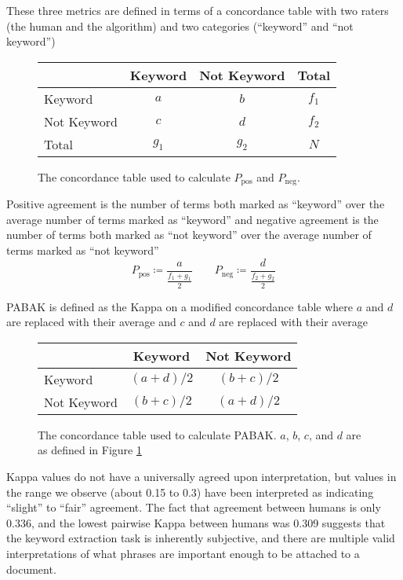 These three metrics are defined in terms of a concordance table with two raters (the human and the algorithm) and two categories (``keyword'' and ``not keyword'')

\begin{figure}[h]
\caption{The concordance table used to calculate $P_{\text{pos}}$ and $P_{\text{neg}}$. }
\label{fig:concordance_1}
\begin{tabular}{l || c c c}
& Keyword & Not Keyword & Total \\
\hline \hline
Keyword & $a$ & $b$ & $f_1$ \\
Not Keyword & $c$ & $d$ & $f_2$ \\
Total & $g_1$ & $g_2$ & $N$ \\
\end{tabular}
\end{figure}

Positive agreement is the number of terms both marked as ``keyword'' over the average number of terms marked as ``keyword'' and negative agreement is the number of terms both marked as ``not keyword'' over the average number of terms marked as ``not keyword''
\begin{equation*}
P_{\text{pos}} \coloneqq \frac{a}{\frac{f_1 + g_1}{2}}
 \qquad P_{\text{neg}} \coloneqq \frac{d}{\frac{f_2 + g_2}{2}}
\end{equation*}

PABAK is defined as the Kappa on a modified concordance table where $a$ and $d$ are replaced with their average and $c$ and $d$ are replaced with their average

\begin{figure}[h]
\caption{The concordance table used to calculate PABAK. $a$, $b$, $c$, and $d$ are as defined in Figure \ref{fig:concordance_1}}
\begin{tabular}{l || c c }
& Keyword & Not Keyword \\
\hline \hline
Keyword & $(a + d) / 2$ & $(b + c) / 2$ \\
Not Keyword & $(b + c) / 2$ & $(a + d) / 2$ \\
\end{tabular}
\end{figure}

Kappa values do not have a universally agreed upon interpretation, but values in the range we observe (about 0.15 to 0.3) have been interpreted as indicating ``slight'' to ``fair'' agreement. The fact that agreement between humans is only 0.336, and the lowest pairwise Kappa between humans was 0.309 suggests that the keyword extraction task is inherently subjective, and there are multiple valid interpretations of what phrases are important enough to be attached to a document.

